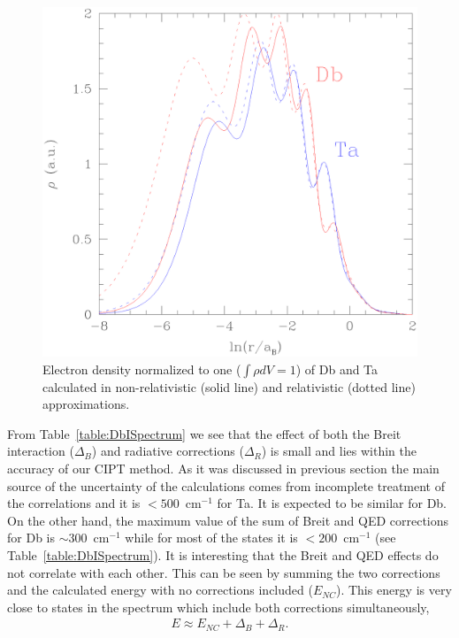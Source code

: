 \documentclass[10pt,a4paper, twoside, openright]{report}
\begin{document}
\begin{figure}[tb]
\includegraphics[scale=0.45]{./figures/ro.eps}
\caption[Relativistic and non-relativistic  electron densities of Db and Ta.]{Electron density normalized to one ($\int \rho dV = 1$) of Db and Ta  calculated in non-relativistic (solid line)
and relativistic (dotted line) approximations.}
\label{f:ro}
\end{figure}
From Table~\ref{table:DbISpectrum} we see that the effect of both the Breit interaction ($\Delta_B$) and radiative corrections 
($\Delta_R$)  is small and lies within the accuracy of our CIPT method. As it was discussed in previous section the main
source of the uncertainty of the calculations comes from incomplete treatment of the correlations and it is $ < 500$~cm$^{-1}$
for Ta. It is expected to be similar for Db. On the other hand, the maximum value of the sum of Breit and QED corrections for 
Db is $\sim 300$~cm$^{-1}$ while for most of the states it is $< 200$~cm$^{-1}$ (see Table~\ref{table:DbISpectrum}).
It is interesting that the Breit and QED effects do not correlate with each other. This can be seen by summing the two  
corrections and the calculated energy with no  corrections included ($E_{NC}$). This energy is very close to states in 
the spectrum which include both corrections simultaneously,
\begin{align*}
E \approx E_{NC} + \Delta_B + \Delta_R.
\end{align*}
\end{document}
